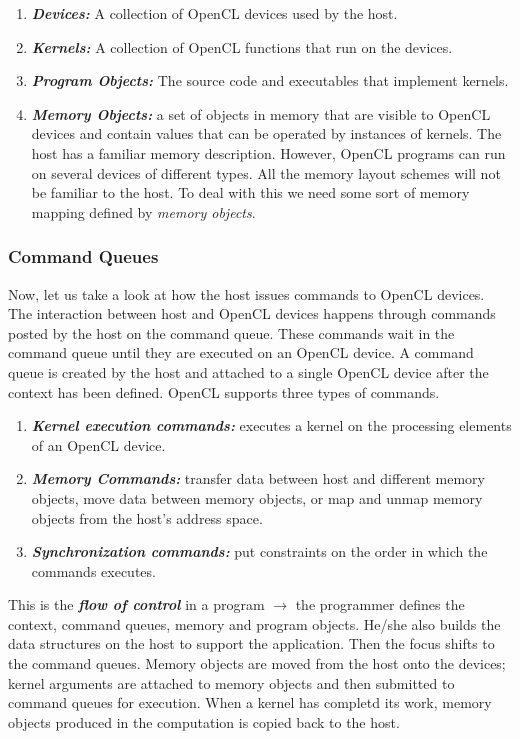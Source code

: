 \begin{enumerate}
	\item \textit{\textbf{Devices:}} A collection of OpenCL devices used by the host.
	\item \textit{\textbf{Kernels:}} A collection of OpenCL functions that run on the devices.
	\item \textit{\textbf{Program Objects:}} The source code and executables that implement kernels.
	\item \textit{\textbf{Memory Objects:}} a set of objects in memory that are visible to OpenCL devices and contain values that can be operated by instances of kernels. The host has a familiar memory description. However, OpenCL programs can run on several devices of different types. All the memory layout schemes will not be familiar to the host. To deal with this we need some sort of memory mapping defined by \textit{memory objects}.
\end{enumerate}
\vspace{1cm}
{\color{red} \date{01-June-2021}}
\subsubsection{Command Queues}
Now, let us take a look at how the host issues commands to OpenCL devices. The interaction between host and OpenCL devices happens through commands posted by the host on the command queue. These commands wait in the command queue until they are executed on an OpenCL device. A command queue is created by the host and attached to a single OpenCL device after the context has been defined. OpenCL supports three types of commands.
\begin{enumerate}
	\item \textit{\textbf{Kernel execution commands:}} executes a kernel on the processing elements of an OpenCL device.
	\item \textit{\textbf{Memory Commands:}} transfer data between host and different memory objects, move data between memory objects, or map and unmap memory objects from the host's address space.
	\item \textit{\textbf{Synchronization commands:}} put constraints on the order in which the commands executes.
\end{enumerate}

This is the \textit{\textbf{flow of control}} in a program $\rightarrow$ the programmer defines the context, command queues, memory and program objects. He/she also builds the data structures on the host to support the application. Then the focus shifts to the command queues. Memory objects are moved from the host onto the devices; kernel arguments are attached to memory objects and then submitted to command queues for execution. When a kernel has completd its work, memory objects produced in the computation is copied back to the host.

